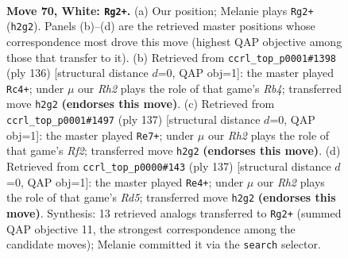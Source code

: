 \documentclass[11pt]{article}
\begin{document}
\clearpage

\begin{figure}[p]\centering
\begin{subfigure}{0.46\textwidth}\centering
\resizebox{\linewidth}{!}{%
\newchessgame
\chessboard[
  setfen={6k1/8/2r5/8/8/8/7R/4K3 w - - 20 70},
  showmover=false,
  pgfstyle=straightmove, color=movearrow, markmove={h2-g2}
]}
\caption{}
\end{subfigure}\hfill
\begin{subfigure}{0.46\textwidth}\centering
\resizebox{\linewidth}{!}{%
\newchessgame
\chessboard[
  setfen={2k5/8/7r/8/1R6/8/8/3K4 w - - 15 69},
  showmover=false,
  pgfstyle=straightmove, color=movearrow, markmove={b4-c4}
]}
\caption{}
\end{subfigure}
\\[4pt]
\begin{subfigure}{0.46\textwidth}\centering
\resizebox{\linewidth}{!}{%
\newchessgame
\chessboard[
  setfen={2R5/5r2/8/8/6k1/8/8/4K3 b - - 18 69},
  showmover=false,
  pgfstyle=straightmove, color=movearrow, markmove={f7-e7}
]}
\caption{}
\end{subfigure}\hfill
\begin{subfigure}{0.46\textwidth}\centering
\resizebox{\linewidth}{!}{%
\newchessgame
\chessboard[
  setfen={8/8/1R6/6k1/3r4/8/4K3/8 b - - 8 69},
  showmover=false,
  pgfstyle=straightmove, color=movearrow, markmove={d4-e4}
]}
\caption{}
\end{subfigure}
\caption{\textbf{Move 70, White: \texttt{Rg2+}.} (a) Our position; Melanie plays \texttt{Rg2+} (\texttt{h2g2}). Panels (b)--(d) are the retrieved master positions whose correspondence most drove this move (highest QAP objective among those that transfer to it). (b) Retrieved from \texttt{ccrl\_top\_p0001\#1398} (ply 136) [structural distance $d$=0, QAP obj=1]: the master played \texttt{Rc4+}; under $\mu$ our \emph{Rh2} plays the role of that game's \emph{Rb4}; transferred move \texttt{h2g2} \textbf{(endorses this move)}. (c) Retrieved from \texttt{ccrl\_top\_p0001\#1497} (ply 137) [structural distance $d$=0, QAP obj=1]: the master played \texttt{Re7+}; under $\mu$ our \emph{Rh2} plays the role of that game's \emph{Rf2}; transferred move \texttt{h2g2} \textbf{(endorses this move)}. (d) Retrieved from \texttt{ccrl\_top\_p0000\#143} (ply 137) [structural distance $d$=0, QAP obj=1]: the master played \texttt{Re4+}; under $\mu$ our \emph{Rh2} plays the role of that game's \emph{Rd5}; transferred move \texttt{h2g2} \textbf{(endorses this move)}. Synthesis: 13 retrieved analogs transferred to \texttt{Rg2+} (summed QAP objective 11, the strongest correspondence among the candidate moves); Melanie committed it via the \texttt{search} selector.}
\label{fig:thought-m138}
\end{figure}
\end{document}
